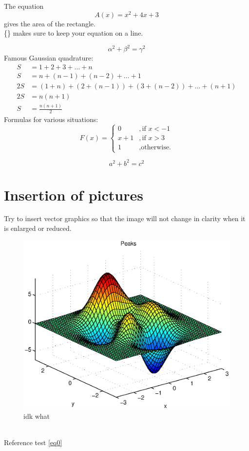 \documentclass[12pt]{article}
\begin{document}
The equation $${A(x)=x^2+4x+3}$$ gives the area of the rectangle.\\
\{\} makes sure to keep your equation on a line.\cite{trevisanato2000tea}

\begin{equation}\label{eq0}
    \alpha^2+\beta^2=\gamma^2
\end{equation}
Famous Gaussian quadrature:
\begin{equation}
    \begin{split}
        S&=1+2+3+\dots+n\\
        S&=n+(n-1)+(n-2)+\dots+1\\
        2S&=(1+n)+(2+(n-1))+(3+(n-2))+\dots+(n+1)\\
        2S&=n(n+1)\\
        S&=\frac{n(n+1)}{2} 
    \end{split}
\end{equation}
Formulas for various situations:
\begin{equation}
    F(x)=
    \begin{cases}
        0&,\text{if $x<-1$}\\
        x+1&,\text{if $x>3$}\\
        1&,\text{otherwise.}
    \end{cases}
\end{equation}

\[
    a^2+b^2=c^2
\]



\newpage
\section{Insertion of pictures}
Try to insert vector graphics\cite{mckay2002role} so that the image will not change in clarity when it is enlarged or reduced.
\begin{figure}[htbp]
    \includegraphics[width=12cm]{mcmthesis-aaa.eps}
    \caption{idk what}
    \label{fig:a}
\end{figure}
\\Reference test \autoref{eq0}
\end{document}
